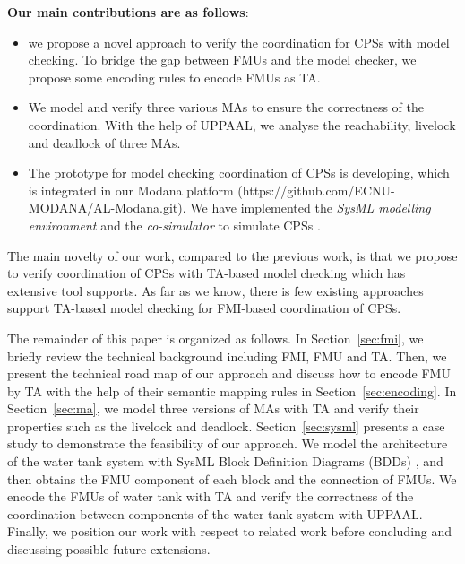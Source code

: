 \textbf{Our main contributions are as follows}:
\begin{itemize}
\item
we propose a novel approach to verify the coordination for CPSs with model checking. To bridge the gap between FMUs and the model checker, we propose some encoding rules to encode FMUs as TA.
\item
We model and verify three various MAs to ensure the correctness of the coordination. With the help of UPPAAL, we analyse the reachability, livelock and deadlock of three MAs.
\item
The prototype for model checking coordination of CPSs is developing, which is integrated in our Modana platform \cite{Cheng2015Modana}(https://github.com/ECNU-MODANA/AL-Modana.git). We have implemented the \textit{SysML modelling environment} and the \textit{co-simulator} to simulate CPSs \cite{Fritzson1998Modelica}.
\end{itemize}
The main novelty of our work, compared to the previous work, is that we propose to verify coordination of CPSs with TA-based model checking which has extensive tool supports. As far as we know, there is few existing approaches support TA-based model checking for FMI-based coordination of CPSs.

The remainder of this paper is organized as follows. In Section~\ref{sec:fmi}, we briefly review the technical background including FMI, FMU and TA. Then, we present the technical road map of our approach and discuss how to encode FMU by TA with the help of their semantic mapping rules in Section~\ref{sec:encoding}. In Section~\ref{sec:ma}, we model three versions of MAs with TA and verify their properties such as the livelock and deadlock. Section~\ref{sec:sysml} presents a case study to demonstrate the feasibility of our approach. We model the architecture of the water tank system with SysML Block Definition Diagrams (BDDs) \cite{SemerathBHSV17}, and then obtains the FMU component of each block and the connection of FMUs. We encode the FMUs of water tank with TA and verify the correctness of the coordination between components of the water tank system with UPPAAL. Finally, we position our work with respect to related work before concluding and discussing possible future extensions.




















